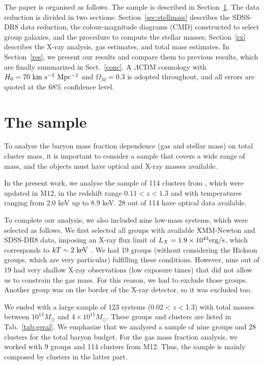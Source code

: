 \documentclass{aa}
\begin{document}
The paper is organised as follows.  The sample is described in
Section~\ref{smp}. The data reduction is divided in two sections:
Section~\ref{sec:stellmass} describes the SDSS-DR8 data reduction, the
colour-magnitude diagrams (CMD) constructed to select group galaxies, and the
procedure to compute the stellar masses; Section~\ref{rx}
describes the X-ray analysis, gas estimates, and total mass estimates. In
Section~\ref{res}, we present our results and compare them to previous
results, which are finally summarized in Sect.~\ref{conc}. A $\Lambda$CDM
cosmology with $H_{0} = 70\ \rm km\ s^{-1}\ Mpc^{-1}$ and $\Omega_{M} = 0.3$
is adopted throughout, and all errors are quoted at the 68\% confidence level.

 

\section{The sample}
\label{smp}

To analyse the baryon mass fraction dependence (gas and stellar mass)
on total cluster mass, it is important to consider a sample that covers a
wide range of mass, and the objects must have optical and X-ray masses
available. 

In the present work, we analyse the sample of 114 clusters from
\citet{M08}, which were updated in {M12}, in the redshift range $0.11 < z <
1.3$ and with temperatures ranging from 2.0 keV up to 8.9 keV. 
28 out of 114 have optical data available.

To complete our analysis, we also included nine low-mass systems,
which were selected as follows.  We first selected all groups with available XMM-Newton and
SDSS-DR8 data, imposing an X-ray flux limit of $L_{X}=1.9
\times 10^{43} \rm erg/s$, which corresponds to $kT \sim 2\ \rm keV$
\citep{eck11}.  We had 19 groups (without considering the Hickson
groups, which are very particular) fulfilling these
conditions. However, nine out of 19 had very shallow X-ray observations
(low exposure times) that did not allow us to constrain the gas
mass. For this reason, we had to exclude those groups. Another group was
on the border of the X-ray detector, so it was excluded too.

We ended with a large sample of 123 systems (0.02$<z<$1.3) with
total masses between $10^{13} M_{\odot}$ and $4 \times 10^{15}
M_{\odot}$. These groups and clusters are listed in
Tab.~\ref{tab:geral}.  We emphasize that we analysed a sample of nine groups and 28 clusters
for the total baryon budget. For the gas mass
fraction analysis, we worked with 9 groups and 114 clusters from
M12. Thus,  the sample is mainly composed by
clusters in the latter part.
\end{document}

